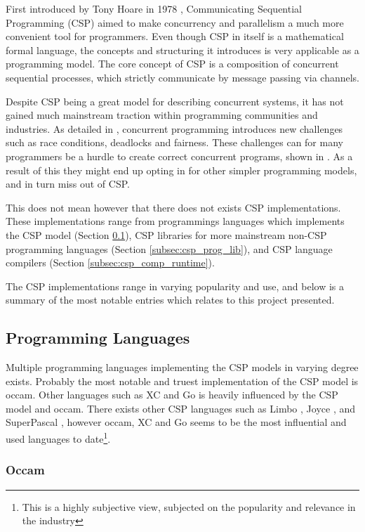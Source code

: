 First introduced by Tony Hoare in 1978 \citep{csp}, Communicating Sequential Programming (CSP) aimed to make concurrency and parallelism a much more convenient tool for programmers. Even though CSP in itself is a mathematical formal language, the concepts and structuring it introduces is very applicable as a programming model. The core concept of CSP is a composition of concurrent sequential processes, which strictly communicate by message passing via channels.

Despite CSP being a great model for describing concurrent systems, it has not gained much mainstream traction within programming communities and industries. As detailed in \citet{benari2006}, concurrent programming introduces new challenges such as race conditions, deadlocks and fairness. These challenges can for many programmers be a hurdle to create correct concurrent programs, shown in \citet{ousterhour1996}. As a result of this they might end up opting in for other simpler programming models, and in turn miss out of CSP. 

This does not mean however that there does not exists CSP implementations. These implementations range from programmings languages which implements the CSP model (Section \ref{subsec:csp_prog_lang}), CSP libraries for more mainstream non-CSP programming languages (Section \ref{subsec:csp_prog_lib}), and CSP language compilers (Section \ref{subsec:csp_comp_runtime}).

The CSP implementations range in varying popularity and use, and below is a summary of the most notable entries which relates to this project presented.


\subsection{Programming Languages}
\label{subsec:csp_prog_lang}

Multiple programming languages implementing the CSP models in varying degree exists. Probably the most notable and truest implementation of the CSP model is occam. Other languages such as XC and Go is heavily influenced by the CSP model and occam. There exists other CSP languages such as Limbo \citep{limbo}, Joyce \citep{joyce}, and SuperPascal \citep{superpascal}, however occam, XC and Go seems to be the most influential and used languages to date\footnote{This is a highly subjective view, subjected on the popularity and relevance in the industry}. 


\subsubsection{Occam}
\label{sssec:occam}

